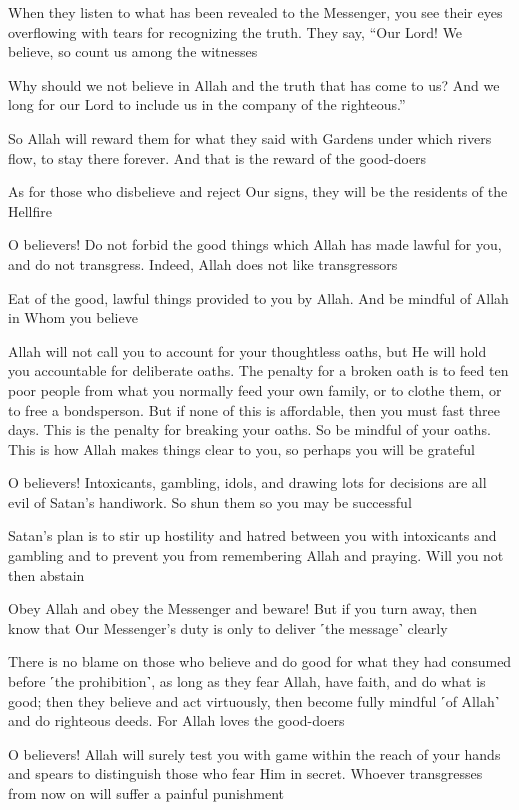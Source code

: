 When they listen to what has been revealed to the Messenger, you see their eyes overflowing with tears for recognizing the truth. They say, “Our Lord! We believe, so count us among the witnesses

Why should we not believe in Allah and the truth that has come to us? And we long for our Lord to include us in the company of the righteous.”

So Allah will reward them for what they said with Gardens under which rivers flow, to stay there forever. And that is the reward of the good-doers

As for those who disbelieve and reject Our signs, they will be the residents of the Hellfire

O believers! Do not forbid the good things which Allah has made lawful for you, and do not transgress. Indeed, Allah does not like transgressors

Eat of the good, lawful things provided to you by Allah. And be mindful of Allah in Whom you believe

Allah will not call you to account for your thoughtless oaths, but He will hold you accountable for deliberate oaths. The penalty for a broken oath is to feed ten poor people from what you normally feed your own family, or to clothe them, or to free a bondsperson. But if none of this is affordable, then you must fast three days. This is the penalty for breaking your oaths. So be mindful of your oaths. This is how Allah makes things clear to you, so perhaps you will be grateful

O believers! Intoxicants, gambling, idols, and drawing lots for decisions are all evil of Satan’s handiwork. So shun them so you may be successful

Satan’s plan is to stir up hostility and hatred between you with intoxicants and gambling and to prevent you from remembering Allah and praying. Will you not then abstain

Obey Allah and obey the Messenger and beware! But if you turn away, then know that Our Messenger’s duty is only to deliver ˹the message˺ clearly

There is no blame on those who believe and do good for what they had consumed before ˹the prohibition˺, as long as they fear Allah, have faith, and do what is good; then they believe and act virtuously, then become fully mindful ˹of Allah˺ and do righteous deeds. For Allah loves the good-doers

O believers! Allah will surely test you with game within the reach of your hands and spears to distinguish those who fear Him in secret. Whoever transgresses from now on will suffer a painful punishment

